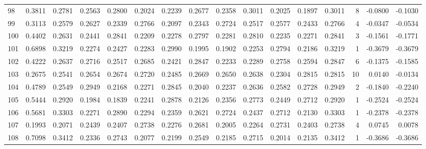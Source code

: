 \begin{tabular}{lrrrrrrrrrrrrrrr}
98  &      0.3811 &  0.2781 &  0.2563 &  0.2800 &  0.2024 &  0.2239 &  0.2677 &  0.2358 &  0.3011 &  0.2025 &   0.1897 &     0.3011 &      8 &                   -0.0800 &                    -0.1030 \\
99  &      0.3113 &  0.2579 &  0.2627 &  0.2339 &  0.2766 &  0.2097 &  0.2343 &  0.2724 &  0.2517 &  0.2577 &   0.2433 &     0.2766 &      4 &                   -0.0347 &                    -0.0534 \\
100 &      0.4402 &  0.2631 &  0.2441 &  0.2841 &  0.2209 &  0.2278 &  0.2797 &  0.2281 &  0.2810 &  0.2235 &   0.2271 &     0.2841 &      3 &                   -0.1561 &                    -0.1771 \\
101 &      0.6898 &  0.3219 &  0.2274 &  0.2427 &  0.2283 &  0.2990 &  0.1995 &  0.1902 &  0.2253 &  0.2794 &   0.2186 &     0.3219 &      1 &                   -0.3679 &                    -0.3679 \\
102 &      0.4222 &  0.2637 &  0.2716 &  0.2517 &  0.2685 &  0.2421 &  0.2847 &  0.2233 &  0.2289 &  0.2758 &   0.2594 &     0.2847 &      6 &                   -0.1375 &                    -0.1585 \\
103 &      0.2675 &  0.2541 &  0.2654 &  0.2674 &  0.2720 &  0.2485 &  0.2669 &  0.2650 &  0.2638 &  0.2304 &   0.2815 &     0.2815 &     10 &                    0.0140 &                    -0.0134 \\
104 &      0.4789 &  0.2549 &  0.2949 &  0.2168 &  0.2271 &  0.2845 &  0.2040 &  0.2237 &  0.2636 &  0.2582 &   0.2728 &     0.2949 &      2 &                   -0.1840 &                    -0.2240 \\
105 &      0.5444 &  0.2920 &  0.1984 &  0.1839 &  0.2241 &  0.2878 &  0.2126 &  0.2356 &  0.2773 &  0.2449 &   0.2712 &     0.2920 &      1 &                   -0.2524 &                    -0.2524 \\
106 &      0.5681 &  0.3303 &  0.2271 &  0.2890 &  0.2294 &  0.2359 &  0.2621 &  0.2724 &  0.2437 &  0.2712 &   0.2130 &     0.3303 &      1 &                   -0.2378 &                    -0.2378 \\
107 &      0.1993 &  0.2071 &  0.2439 &  0.2407 &  0.2738 &  0.2276 &  0.2681 &  0.2005 &  0.2264 &  0.2731 &   0.2403 &     0.2738 &      4 &                    0.0745 &                     0.0078 \\
108 &      0.7098 &  0.3412 &  0.2336 &  0.2743 &  0.2077 &  0.2199 &  0.2549 &  0.2185 &  0.2715 &  0.2014 &   0.2135 &     0.3412 &      1 &                   -0.3686 &                    -0.3686 \\

\end{tabular}
